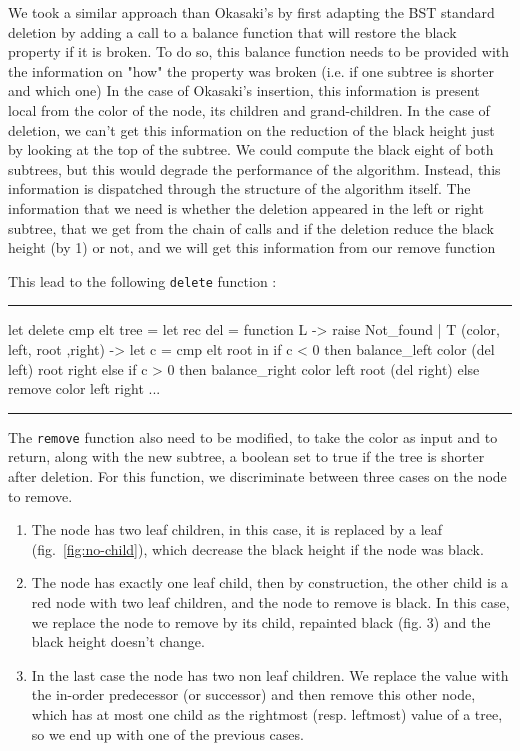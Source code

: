 \documentclass[10pt,a4paper]{article}
\newcommand{\code}{\texttt}
\newenvironment{codeblock}%
{\center \minipage{\textwidth} \vspace{6pt} \hrule \vspace{6pt} \minted{ocaml}}%
{\endminted \hrule \vspace{6pt} \endminipage \endcenter}
\begin{document}
We took a similar approach than Okasaki's by first adapting the BST standard deletion by adding a call to a balance function that will restore the black property if it is broken.
To do so, this balance function needs to be provided with the information on "how" the property was broken (i.e. if one subtree is shorter and which one)
In the case of Okasaki's insertion, this information is present local from the color of the node, its children and grand-children. In the case of deletion, we can't get this information on the reduction of the black height just by looking at the top of the subtree.
We could compute the black eight of both subtrees, but this would degrade the performance of the algorithm.
Instead, this information is dispatched through the structure of the algorithm itself.
The information that we need is whether the deletion appeared in the left or right subtree, that we get from the chain of calls and if the deletion reduce the black height (by 1) or not, and we will get this information from our remove function


This lead to the following \code{delete} function :
\begin{codeblock}
let delete cmp elt tree =
    let rec del = function
        L -> raise Not_found
      | T (color, left, root ,right) ->
        let c = cmp elt root in
        if c < 0 then balance_left color (del left) root right
        else if c > 0 then balance_right color left root (del right)
        else remove color left right
     ...
\end{codeblock}

The \code{remove} function also need to be modified, to take the color as input and to return, along with the new subtree, a boolean set to true if the tree is shorter after deletion.
For this function, we discriminate between three cases on the node to remove.

\begin{enumerate}
  \item The node has two leaf children, in this case, it is replaced by a leaf (fig.~\ref{fig:no-child}), which decrease the black height if the node was black.
  \item The node has exactly one leaf child, then by construction, the other child is a red node with two leaf children, and the node to remove is black. In this case, we replace the node to remove by its child, repainted black (fig. 3) and the black height doesn't change.
  \item In the last case the node has two non leaf children. We replace the value with the in-order predecessor (or successor) and then remove this other node, which has at most one child as the rightmost (resp. leftmost) value of a tree, so we end up with one of the previous cases.
\end{enumerate}
\end{document}
